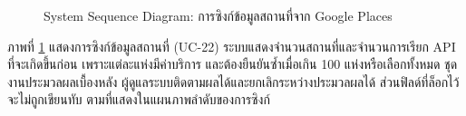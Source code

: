 \begin{figure}[H]
\centering
{}
\caption{System Sequence Diagram: การซิงก์ข้อมูลสถานที่จาก Google Places}
\label{fig:ssd_admin_sync}
\end{figure}

ภาพที่ \ref{fig:ssd_admin_sync} แสดงการซิงก์ข้อมูลสถานที่ (UC-22) ระบบแสดงจำนวนสถานที่และจำนวนการเรียก API ที่จะเกิดขึ้นก่อน เพราะแต่ละแห่งมีค่าบริการ และต้องยืนยันซ้ำเมื่อเกิน 100 แห่งหรือเลือกทั้งหมด ชุดงานประมวลผลเบื้องหลัง ผู้ดูแลระบบติดตามผลได้และยกเลิกระหว่างประมวลผลได้ ส่วนฟิลด์ที่ล็อกไว้จะไม่ถูกเขียนทับ ตามที่แสดงในแผนภาพลำดับของการซิงก์

